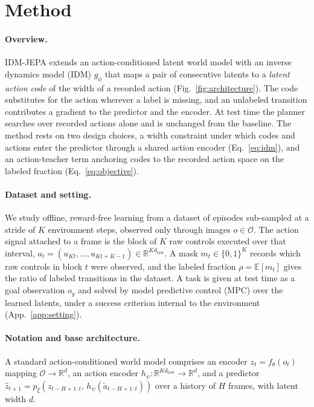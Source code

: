 \documentclass{article}
\begin{document}
\section{Method}
\label{sec:method}

\paragraph{Overview.}
IDM-JEPA extends an action-conditioned latent world model with an inverse
dynamics model (IDM) $g_\phi$ that maps a pair of consecutive latents to a
\emph{latent action code} of the width of a recorded action
(Fig.~\ref{fig:architecture}). The code substitutes for the action wherever a
label is missing, and an unlabeled transition contributes a gradient to the
predictor and the encoder. At test time the planner searches over recorded
actions alone and is unchanged from the baseline. The method rests on two
design choices, a width constraint under which codes and actions enter the
predictor through a shared action encoder (Eq.~\ref{eq:idm}), and an
action-teacher term anchoring codes to the recorded action space on the labeled
fraction (Eq.~\ref{eq:objective}).

\paragraph{Dataset and setting.}
We study offline, reward-free learning from a dataset of episodes sub-sampled at a
stride of $K$ environment steps, observed only through images
$o \in \mathcal{O}$. The action signal attached to a frame is the block of $K$ raw
controls executed over that interval,
$a_t = (u_{Kt}, \dots, u_{Kt+K-1}) \in \mathbb{R}^{K d_{\mathrm{raw}}}$.
A mask $m_t \in \{0,1\}^{K}$ records which raw controls in block $t$ were observed,
and the labeled fraction $\rho = \mathbb{E}[m_t]$ gives the ratio of labeled
transitions in the dataset. A task is given at test time as a goal observation
$o_g$ and solved by model predictive control (MPC) over the learned latents, under
a success criterion internal to the environment (App.~\ref{app:setting}).

\paragraph{Notation and base architecture.}
A standard action-conditioned world model comprises an encoder
$z_t = f_\theta(o_t)$ mapping $\mathcal{O} \to \mathbb{R}^{d}$, an action encoder
$h_\psi : \mathbb{R}^{K d_{\mathrm{raw}}} \to \mathbb{R}^{d}$, and a predictor
$\hat z_{t+1} = p_\xi(z_{t-H+1:t},\, h_\psi(\tilde a_{t-H+1:t}))$ over a history of
$H$ frames, with latent width $d$.
\end{document}
